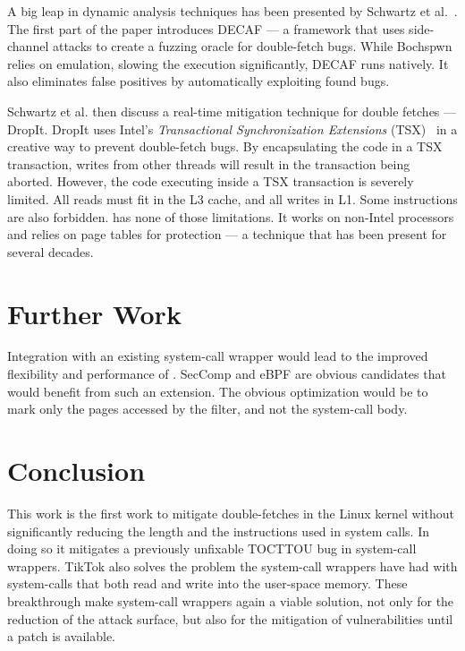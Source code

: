 A big leap in dynamic analysis techniques has been presented by Schwartz et
al.~\cite{schwarz2018automated}. The first part of the paper introduces DECAF
--- a framework that uses side-channel attacks to create a fuzzing oracle for
double-fetch bugs. While Bochspwn relies on emulation, slowing the execution
significantly, DECAF runs natively. It also eliminates false positives by
automatically exploiting found bugs.

Schwartz et al. then discuss a real-time mitigation technique for double
fetches --- DropIt. DropIt uses Intel's \emph{Transactional Synchronization 
Extensions} (TSX)~\cite{intel64and} in a creative way to prevent double-fetch
bugs. By encapsulating the code in a TSX transaction, writes from other threads
will result in the
transaction being aborted. However, the code executing inside a TSX transaction
is severely limited. All reads must fit in the L3 cache, and all writes in L1.
Some instructions are also forbidden. \sysname has none of those limitations.
It works on non-Intel processors and relies on page tables for protection --- a
technique that has been present for several decades.

\section{Further Work}
\label{sec:furtherwork}
Integration with an existing system-call wrapper would lead to the improved
flexibility and performance of \sysname. SecComp\cite{seccomp} and
eBPF\cite{ebpf} are obvious candidates that would benefit from such an
extension. The obvious optimization would be to mark only the pages accessed by
the filter, and not the system-call body.

\section{Conclusion}

This work is the first work to mitigate double-fetches in the Linux kernel
without significantly reducing the length and the instructions used in system
calls. In doing so it mitigates a previously unfixable TOCTTOU bug in
system-call wrappers. TikTok also solves the problem the system-call wrappers
have had with system-calls that both read and write into the user-space memory.
These breakthrough make system-call wrappers again a viable solution, not only
for the reduction of the attack surface, but also for the mitigation of
vulnerabilities until a patch is available.

